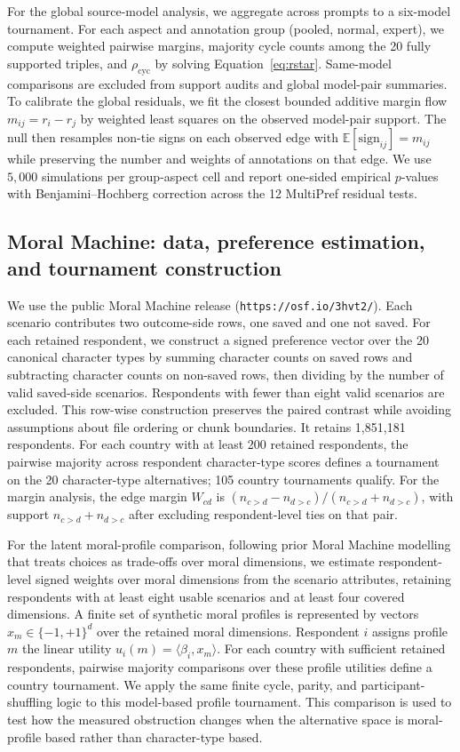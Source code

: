 \documentclass[10pt]{article}
\theoremstyle{definition}
\theoremstyle{remark}
\begin{document}
For the global source-model analysis, we aggregate across prompts to a six-model tournament. For each aspect and annotation group (pooled, normal, expert), we compute weighted pairwise margins, majority cycle counts among the 20 fully supported triples, and $\rho_{\mathrm{cyc}}$ by solving Equation~\eqref{eq:rstar}. Same-model comparisons are excluded from support audits and global model-pair summaries. To calibrate the global residuals, we fit the closest bounded additive margin flow $m_{ij}=r_i-r_j$ by weighted least squares on the observed model-pair support. The null then resamples non-tie signs on each observed edge with $\mathbb{E}[\mathrm{sign}_{ij}]=m_{ij}$ while preserving the number and weights of annotations on that edge. We use $5{,}000$ simulations per group-aspect cell and report one-sided empirical $p$-values with Benjamini--Hochberg correction across the 12 MultiPref residual tests.

\subsection*{Moral Machine: data, preference estimation, and tournament construction}

We use the public Moral Machine release (\texttt{https://osf.io/3hvt2/})\cite{awad2018}. Each scenario contributes two outcome-side rows, one saved and one not saved. For each retained respondent, we construct a signed preference vector over the 20 canonical character types by summing character counts on saved rows and subtracting character counts on non-saved rows, then dividing by the number of valid saved-side scenarios. Respondents with fewer than eight valid scenarios are excluded. This row-wise construction preserves the paired contrast while avoiding assumptions about file ordering or chunk boundaries. It retains 1,851,181 respondents. For each country with at least 200 retained respondents, the pairwise majority across respondent character-type scores defines a tournament on the 20 character-type alternatives; 105 country tournaments qualify. For the margin analysis, the edge margin $W_{cd}$ is $(n_{c>d}-n_{d>c})/(n_{c>d}+n_{d>c})$, with support $n_{c>d}+n_{d>c}$ after excluding respondent-level ties on that pair.

For the latent moral-profile comparison, following prior Moral Machine modelling that treats choices as trade-offs over moral dimensions\cite{awad2018,noothigattu2018,kim2018moral}, we estimate respondent-level signed weights over moral dimensions from the scenario attributes, retaining respondents with at least eight usable scenarios and at least four covered dimensions. A finite set of synthetic moral profiles is represented by vectors $x_m\in\{-1,+1\}^{d}$ over the retained moral dimensions. Respondent $i$ assigns profile $m$ the linear utility $u_i(m)=\langle\beta_i,x_m\rangle$. For each country with sufficient retained respondents, pairwise majority comparisons over these profile utilities define a country tournament. We apply the same finite cycle, parity, and participant-shuffling logic to this model-based profile tournament. This comparison is used to test how the measured obstruction changes when the alternative space is moral-profile based rather than character-type based.
\end{document}
